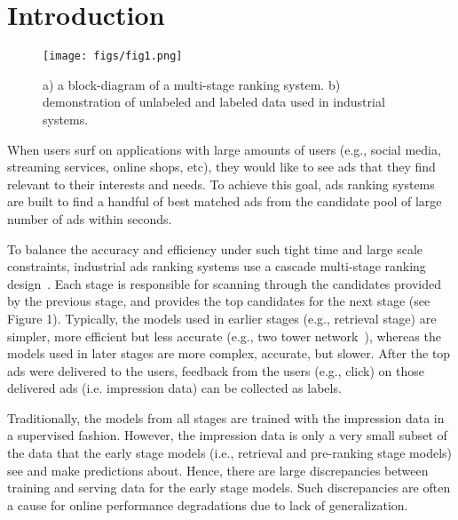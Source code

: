 \section{Introduction}
\begin{figure}
\centering
\texttt{[image: figs/fig1.png]}
  \caption{a) a block-diagram of a multi-stage ranking system. b) demonstration of unlabeled and labeled data used in industrial systems.}
  \label{fig:teaser}
\end{figure}
When users surf on applications with large amounts of users (e.g., social media, streaming services, online shops, etc), they would like to see ads that they find relevant to their interests and needs. To achieve this goal, ads ranking systems are built to find a handful of best matched ads from the candidate pool of large number of ads within seconds.

To balance the accuracy and efficiency under such tight time and large scale constraints, industrial ads ranking systems use a cascade multi-stage ranking design~\cite{wang2023towards}. Each stage is responsible for scanning through the candidates provided by the previous stage, and provides the top candidates for the next stage (see Figure 1). Typically, the models used in earlier stages (e.g., retrieval stage) are simpler, more efficient but less accurate (e.g., two tower network~\cite{scalingIG23}), whereas the models used in later stages are more complex, accurate, but slower. After the top ads were delivered to the users, feedback from the users (e.g., click) on those delivered ads (i.e. impression data) can be collected as labels. 

Traditionally, the models from all stages are trained with the impression data in a supervised fashion. However, the impression data is only a very small subset of the data that the early stage models (i.e., retrieval and pre-ranking stage models) see and make predictions about. Hence, there are large discrepancies between training and serving data for the early stage models. Such discrepancies are often a cause for online performance degradations due to lack of generalization.

